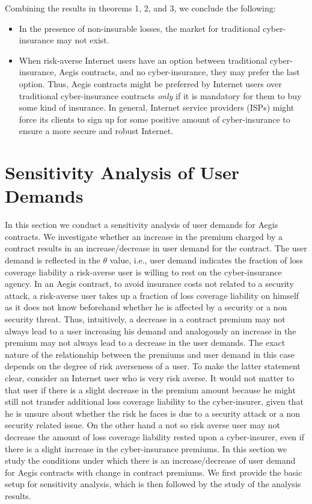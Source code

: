 \documentclass[letterpaper,12pt, onecolumn, nodraft]{IEEEtran}
\begin{document}
Combining the results in theorems 1, 2, and 3, we conclude the following: 
\begin{itemize}
\item In the presence of non-insurable losses, the market for traditional cyber-insurance may not exist. 
\item When risk-averse Internet users have an option between traditional cyber-insurance, Aegis contracts, and no cyber-insurance, they may prefer the last option. Thus, Aegis contracts might be preferred by Internet users over traditional cyber-insurance contracts \emph{only} if it is mandatory for them to buy some kind of insurance. In general, Internet service providers (ISPs) might force its clients to sign up for some positive amount of cyber-insurance to ensure a more secure and robust Internet.   
\end{itemize}

\section{Sensitivity Analysis of User Demands} \label{sec-analysis}
In this section we conduct a sensitivity analysis of user demands for Aegis contracts. We investigate whether an increase in the premium charged by a contract results in an increase/decrease in user demand for the contract. The user demand is reflected in the $\theta$ value, i.e., user demand indicates the fraction of loss coverage liability a risk-averse user is willing to rest on the cyber-insurance agency. In an Aegis contract, to avoid insurance costs not related to a security attack, a risk-averse user takes up a fraction of loss coverage liability on himself  as it does not know beforehand whether he is affected by a security or a non security threat. Thus, intuitively, a decrease in a contract premium may not always lead to a user increasing his demand and analogously an increase in the premium may not always lead to a decrease in the user demands. The exact nature of the relationship between the premiums and user demand in this case depends on the degree of risk averseness of a user. To make the latter statement clear, consider an Internet user who is very risk averse. It would not matter to that user if there is a slight decrease in the premium amount because he might still not  transfer additional loss coverage liability to the cyber-insurer, given that he is unsure about whether the risk he faces is due to a security attack or a non security related issue. On the other hand a not so risk averse user may not decrease the amount of loss coverage liability rested upon a cyber-insurer, even if there is a slight increase in the cyber-insurance premiums. In this section we study the conditions under which there is an increase/decrease of user demand for Aegis contracts with change in contract premiums. We first provide the basic setup for sensitivity analysis, which is then followed by the study of the analysis results. 
\end{document}
